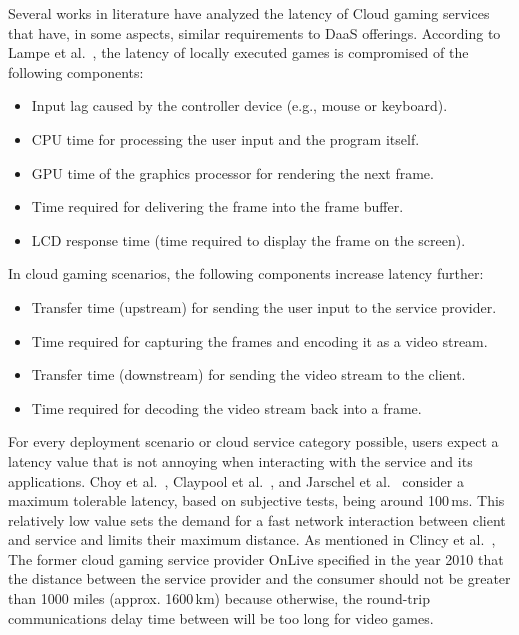 \documentclass[runningheads]{llncs}
\begin{document}
Several works in literature have analyzed the latency of Cloud gaming services that have, in some aspects, similar requirements to DaaS offerings. According to Lampe et al.~\cite{lampe2014assessing}, the latency of locally executed games is compromised of the following components:

\begin{itemize}
\item Input lag caused by the controller device (e.g., mouse or keyboard).
\item CPU time for processing the user input and the program itself.
\item GPU time of the graphics processor for rendering the next frame.
\item Time required for delivering the frame into the frame buffer.
\item LCD response time (time required to display the frame on the screen).
\end{itemize}

In cloud gaming scenarios, the following components increase latency further: 

\begin{itemize}
\item Transfer time (upstream) for sending the user input to the service provider.
\item Time required for capturing the frames and encoding it as a video stream.
\item Transfer time (downstream) for sending the video stream to the client.
\item Time required for decoding the video stream back into a frame.
\end{itemize}

For every deployment scenario or cloud service category possible, users expect a latency value that is not annoying when interacting with the service and its applications. Choy et al.~\cite{ChoyWongSimonRosenberg2012}, Claypool et al.~\cite{claypool2010latency}, and Jarschel et al.~\cite{jarschel2011evaluation} consider a maximum tolerable latency, based on subjective tests, being around 100\,ms. This relatively low value sets the demand for a fast network interaction between client and service and limits their maximum distance. As mentioned in Clincy et al.~\cite{clincy2013subjective}, The former cloud gaming service provider OnLive specified in the year 2010 that the distance between the service provider and the consumer should not be greater than 1000 miles (approx. 1600\,km) because otherwise, the round-trip communications delay time between will be too long for video games. 
\end{document}
